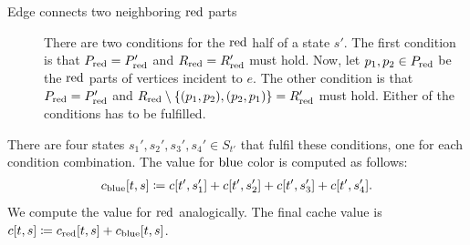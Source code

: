 \begin{lemma}
\begin{description}
		\item[Edge connects two neighboring \( \text{red} \) parts]
		      There are two conditions for the \( \text{red} \) half of a state \( s' \).
		      The first condition is that \( P_{\text{red}} = P_{\text{red}}' \)
		      and \( R_{\text{red}} = R_{\text{red}}' \) must hold.
		      Now, let \( p_1, p_2 \in P_{\text{red}} \) be the \( \text{red} \) parts
		      of vertices incident to \( e \).
		      The other condition is that \( P_{\text{red}} = P_{\text{red}}' \) and
		      \( R_{\text{red}} \setminus \{(p_{1}, p_{2}), (p_{2}, p_{1})\} = R_{\text{red}}' \) must hold.
		      Either of the conditions has to be fulfilled.

	\end{description}
	There are four states \( s_1', s_2', s_3', s_4' \in S_{t'} \)
	that fulfil these conditions, one for each condition combination.
	The value for \( \text{blue} \) color is computed as follows:
	\begin{align*}
		c_{\text{blue}}[t, s] & \coloneqq c[t', s_1'] + c[t', s_2'] + c[t', s_3'] + c[t', s_4']. \\
	\end{align*}
	We compute the value for \( \text{red} \) analogically.
	The final cache value is \( c[t, s] \coloneqq c_{\text{red}}[t, s] + c_{\text{blue}}[t, s] \).
\end{lemma}
%

